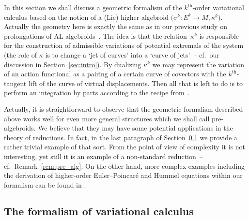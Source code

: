 \documentclass[pdftex]{sigma}
\newcommand{\thh}[1]{#1^{\mathrm{th}}} %
\newcommand{\ra}{\rightarrow}
\newcommand{\prealg}{pre-algebroid} %
\numberwithin{equation}{section}
\theoremstyle{definition}
\begin{document}
In this section we shall discuss a geometric formalism of the $\thh{k}$-order variational calculus based on the notion of a (Lie) higher algebroid $\big(\sigma^k\colon E^k\ra M,\kappa^k\big)$. Actually the geometry here is exactly the same as in our previous study on prolongations of AL algebroids~\cite{MJ_MR_prototypes}. The idea is that the relation~$\kappa^k$ is responsible for the construction of admissible variations of potential extremals of the system (the role of $\kappa$ is to change a `jet of curves' into a `curve of jets'~-- cf.\ our discussion in Section~\ref{sec:intro}). By dualizing $\kappa^k$ we may represent the variation of an action functional as a pairing of a certain curve of covectors with the $\thh{k}$-tangent lift of the curve of virtual displacements. Then all that is left to do is to perform an integration by parts according to the recipe from~\cite{MJ_MR_higher_var_calc_2013}.

Actually, it is straightforward to observe that the geometric formalism described above works well for even more general structures which we shall call \prealg s. We believe that they may have some potential applications in the theory of reductions. In fact, in the last paragraph of Section~\ref{ssec:var_calc} we provide a rather trivial example of that sort. From the point of view of complexity it is not interesting, yet still it is an example of a non-standard reduction~-- cf.\ Remark~\ref{rem:pre_alg}. On the other hand, more complex examples including the derivation of higher-order Euler--Poincar\'e and Hummel equations within our formalism can be found in \cite{MJ_MR_prototypes}.

\subsection{The formalism of variational calculus}\label{ssec:var_calc}
\end{document}

